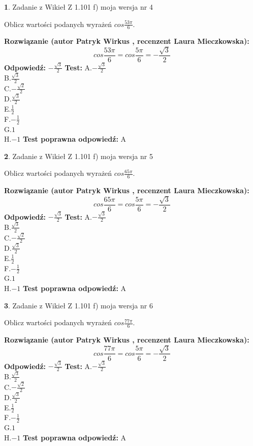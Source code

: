 \documentclass[12pt, a4paper]{article}
\theoremstyle{definition} %
\newtheorem{zad}{}
\newcommand{\zadStart}[1]{\begin{zad}#1\newline}
\newcommand{\zadStop}{\end{zad}}
\newcommand{\rozwStart}[2]{\noindent \textbf{Rozwiązanie (autor #1 , recenzent #2): }\newline}
\newcommand{\rozwStop}{\newline}
\newcommand{\odpStart}{\noindent \textbf{Odpowiedź:}\newline}
\newcommand{\odpStop}{\newline}
\newcommand{\testStart}{\noindent \textbf{Test:}\newline}
\newcommand{\testStop}{\newline}
\newcommand{\kluczStart}{\noindent \textbf{Test poprawna odpowiedź:}\newline}
\newcommand{\kluczStop}{\newline}
\begin{document}
\zadStart{Zadanie z Wikieł Z 1.101 f) moja wersja nr 4}

Oblicz wartości podanych wyrażeń $cos \frac{53\pi}{6}$.
\zadStop
\rozwStart{Patryk Wirkus}{Laura Mieczkowska}
$$cos \frac{53\pi}{6} = cos \frac{5\pi}{6} = -\frac{\sqrt{3}}{2}$$
\rozwStop
\odpStart
$-\frac{\sqrt{3}}{2}$
\odpStop
\testStart
A.$-\frac{\sqrt{3}}{2}$\\
B.$\frac{\sqrt{3}}{2}$\\
C.$-\frac{\sqrt{2}}{2}$\\
D.$\frac{\sqrt{3}}{2}$\\
E.$\frac{1}{2}$\\
F.$-\frac{1}{2}$\\
G.$1$\\
H.$-1$
\testStop
\kluczStart
A
\kluczStop



\zadStart{Zadanie z Wikieł Z 1.101 f) moja wersja nr 5}

Oblicz wartości podanych wyrażeń $cos \frac{65\pi}{6}$.
\zadStop
\rozwStart{Patryk Wirkus}{Laura Mieczkowska}
$$cos \frac{65\pi}{6} = cos \frac{5\pi}{6} = -\frac{\sqrt{3}}{2}$$
\rozwStop
\odpStart
$-\frac{\sqrt{3}}{2}$
\odpStop
\testStart
A.$-\frac{\sqrt{3}}{2}$\\
B.$\frac{\sqrt{3}}{2}$\\
C.$-\frac{\sqrt{2}}{2}$\\
D.$\frac{\sqrt{3}}{2}$\\
E.$\frac{1}{2}$\\
F.$-\frac{1}{2}$\\
G.$1$\\
H.$-1$
\testStop
\kluczStart
A
\kluczStop



\zadStart{Zadanie z Wikieł Z 1.101 f) moja wersja nr 6}

Oblicz wartości podanych wyrażeń $cos \frac{77\pi}{6}$.
\zadStop
\rozwStart{Patryk Wirkus}{Laura Mieczkowska}
$$cos \frac{77\pi}{6} = cos \frac{5\pi}{6} = -\frac{\sqrt{3}}{2}$$
\rozwStop
\odpStart
$-\frac{\sqrt{3}}{2}$
\odpStop
\testStart
A.$-\frac{\sqrt{3}}{2}$\\
B.$\frac{\sqrt{3}}{2}$\\
C.$-\frac{\sqrt{2}}{2}$\\
D.$\frac{\sqrt{3}}{2}$\\
E.$\frac{1}{2}$\\
F.$-\frac{1}{2}$\\
G.$1$\\
H.$-1$
\testStop
\kluczStart
A
\kluczStop
\end{document}
